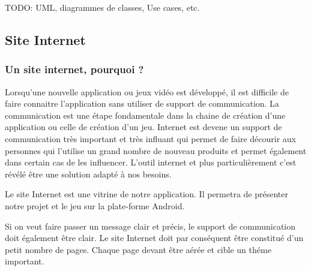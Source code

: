 \documentclass[a4paper,11pt,french]{article}
\def\android{Android\texttrademark{}}
\begin{document}



TODO: UML, diagrammes de classes, Use cases, etc.

\subsection{Site Internet}
\subsubsection{Un site internet, pourquoi ?}
Lorsqu'une nouvelle application ou jeux vidéo est développé, il est difficile de faire connaitre l'application
sans utiliser de support de communication.
La communication est une étape fondamentale dans la chaine de création d'une application ou celle de création d'un jeu.
Internet est devene un support de communication très important et très influant qui permet de faire décourir aux
personnes qui l'utilise un grand nombre de nouveau produits et permet également dans certain cas de les influencer.
L'outil internet et plus particulièrement c'est révélé être une solution adapté à nos besoins.

Le site Internet est une vitrine de notre application. Il permetra de présenter notre projet et le jeu sur la plate-forme \android{}.

Si on veut faire passer un message clair et précis, le support de communication doit également être clair. Le site Internet 
doit par conséquent être constitué d'un petit nombre de pages. Chaque page devant être aérée et cible un théme important.
\end{document}
